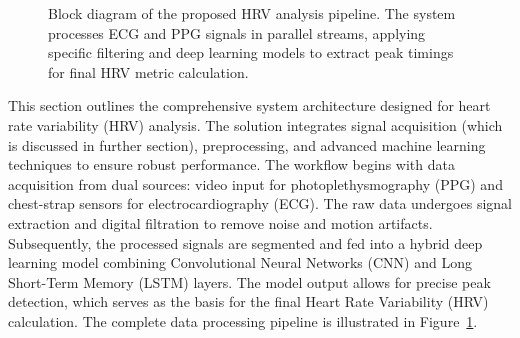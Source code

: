 \documentclass{citask}
\begin{document}
\begin{figure}[htbp]
{
    }
    \caption{Block diagram of the proposed HRV analysis pipeline. The system processes ECG and PPG signals in parallel streams, applying specific filtering and deep learning models to extract peak timings for final HRV metric calculation.}
    \label{fig:system_diagram}
\end{figure}

This section outlines the comprehensive system architecture designed for heart rate variability (HRV) analysis. The solution integrates signal acquisition (which is discussed in further section), preprocessing, and advanced machine learning techniques to ensure robust performance. The workflow begins with data acquisition from dual sources: video input for photoplethysmography (PPG) and chest-strap sensors for electrocardiography (ECG). The raw data undergoes signal extraction and digital filtration to remove noise and motion artifacts. Subsequently, the processed signals are segmented and fed into a hybrid deep learning model combining Convolutional Neural Networks (CNN) and Long Short-Term Memory (LSTM) layers. The model output allows for precise peak detection, which serves as the basis for the final Heart Rate Variability (HRV) calculation. The complete data processing pipeline is illustrated in Figure~\ref{fig:system_diagram}.

\end{document}
